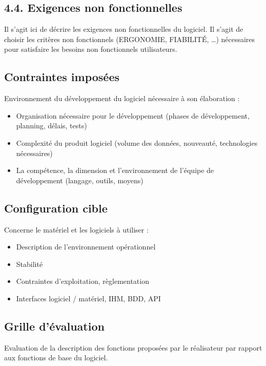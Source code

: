 \documentclass{mise_en_page}
\begin{document}
\subsection[Exigences non fonctionnelles]{4.4. Exigences non
fonctionnelles}
Il s’agit ici de décrire les exigences non fonctionnelles du logiciel.
Il s’agit de choisir les critères non fonctionnels (ERGONOMIE,
FIABILITÉ, …) nécessaires pour satisfaire les besoins non fonctionnels
utilisateurs.

\subsection[Contraintes imposées]{Contraintes imposées}
Environnement du développement du logiciel nécessaire à son élaboration 
:

\begin{itemize}
\item Organisation nécessaire pour le développement (phases de
développement, planning, délais, tests)
\item Complexité du produit logiciel (volume des données, nouveauté,
technologies nécessaires)
\item La compétence, la dimension et l’environnement de l’équipe de
développement (langage, outils, moyens)
\end{itemize}

\subsection[Configuration cible]{Configuration cible}
Concerne le matériel et les logiciels à utiliser :

\begin{itemize}
\item Description de l’environnement opérationnel
\item Stabilité
\item Contraintes d’exploitation, règlementation
\item Interfaces logiciel / matériel, IHM, BDD, API
\end{itemize}


\subsection[Grille d’évaluation]{Grille d’évaluation}
Evaluation de la description des fonctions proposées par le réalisateur
par rapport aux fonctions de base du logiciel.\newline
\end{document}
